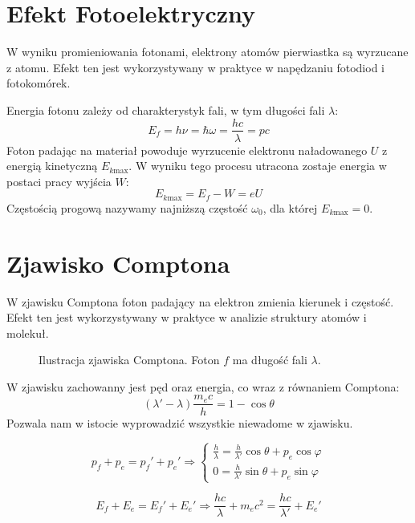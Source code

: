 \documentclass{../notatki}
\begin{document}
\section{Efekt Fotoelektryczny}

W wyniku promieniowania fotonami, elektrony atomów pierwiastka są
wyrzucane z atomu. Efekt ten jest wykorzystywany w praktyce w
napędzaniu fotodiod i fotokomórek.

Energia fotonu zależy od charakterystyk fali, w tym długości fali $\lambda$:
$$
E_f = h\nu = \hbar \omega = \frac{hc}{\lambda} = pc
$$
Foton padając na materiał powoduje wyrzucenie elektronu naładowanego
$U$ z energią kinetyczną $E_{k \text{max}}$. W wyniku tego procesu
utracona zostaje energia w postaci pracy wyjścia $W$:
$$
E_{k \text{max}} = E_f - W = eU
$$
Częstością progową nazywamy najniższą częstość $\omega_0$, dla której
$E_{k \text{max}} = 0$.

\section{Zjawisko Comptona}

W zjawisku Comptona foton padający na elektron zmienia kierunek i
częstość. Efekt ten jest wykorzystywany w praktyce w analizie struktury
atomów i molekuł.

\begin{figure}[h]
  \centering
  \caption{Ilustracja zjawiska Comptona. Foton $f$ ma długość fali $\lambda$.}
\end{figure}

W zjawisku zachowanny jest pęd oraz energia, co wraz z równaniem Comptona:
$$
(\lambda' - \lambda) \frac{m_ec}{h} = 1 - \cos\theta
$$
Pozwala nam w istocie wyprowadzić wszystkie niewadome w zjawisku.

$$
p_f + p_e = p_f' + p_e' \Rightarrow
\begin{cases}
  \frac{h}{\lambda} = \frac{h}{\lambda'}\cos\theta + p_e\cos\varphi \\
  0 = \frac{h}{\lambda'}\sin\theta + p_e\sin\varphi
\end{cases}
$$

$$
E_f + E_e = E_f' + E_e' \Rightarrow \frac{hc}{\lambda} + m_ec^2 =
\frac{hc}{\lambda'} + E_e'
$$
\end{document}
